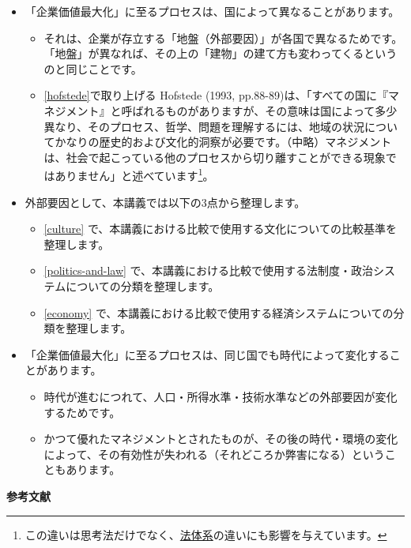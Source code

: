 \documentclass[
]{book}
\begin{document}
\begin{itemize}
\item
  「企業価値最大化」に至るプロセスは、国によって異なることがあります。

  \begin{itemize}
  \item
    それは、企業が存立する「地盤（外部要因）」が各国で異なるためです。「地盤」が異なれば、その上の「建物」の建て方も変わってくるというのと同じことです。
  \item
    \ref{hofstede}で取り上げる Hofstede (1993, pp.88-89)は、「すべての国に『マネジメント』と呼ばれるものがありますが、その意味は国によって多少異なり、そのプロセス、哲学、問題を理解するには、地域の状況についてかなりの歴史的および文化的洞察が必要です。（中略）マネジメントは、社会で起こっている他のプロセスから切り離すことができる現象ではありません」と述べています\footnote{この違いは思考法だけでなく、\protect\hyperlink{law}{法体系}の違いにも影響を与えています。}。
  \end{itemize}
\end{itemize}

\begin{itemize}
\item
  外部要因として、本講義では以下の3点から整理します。

  \begin{itemize}
  \item
    \ref{culture} で、本講義における比較で使用する文化についての比較基準を整理します。
  \item
    \ref{politics-and-law} で、本講義における比較で使用する法制度・政治システムについての分類を整理します。
  \item
    \ref{economy} で、本講義における比較で使用する経済システムについての分類を整理します。
  \end{itemize}
\item
  「企業価値最大化」に至るプロセスは、同じ国でも時代によって変化することがあります。

  \begin{itemize}
  \item
    時代が進むにつれて、人口・所得水準・技術水準などの外部要因が変化するためです。
  \item
    かつて優れたマネジメントとされたものが、その後の時代・環境の変化によって、その有効性が失われる（それどころか弊害になる）ということもあります。
  \end{itemize}
\end{itemize}

{\textbf{参考文献}}
\end{document}
